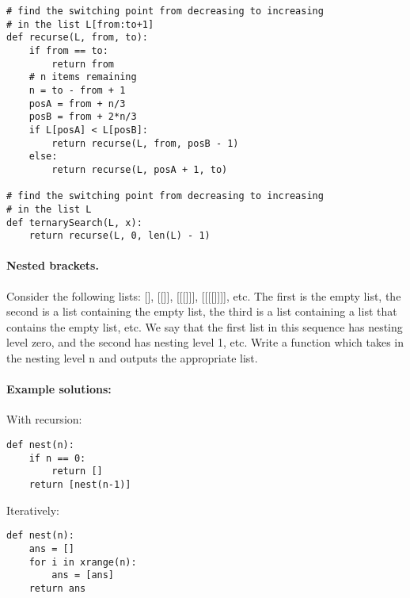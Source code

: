 \documentclass[11pt]{article}
\begin{document}
\begin{verbatim}
# find the switching point from decreasing to increasing
# in the list L[from:to+1]
def recurse(L, from, to):
    if from == to:
        return from
    # n items remaining
    n = to - from + 1
    posA = from + n/3
    posB = from + 2*n/3
    if L[posA] < L[posB]:
        return recurse(L, from, posB - 1)
    else:
        return recurse(L, posA + 1, to)

# find the switching point from decreasing to increasing
# in the list L
def ternarySearch(L, x):
    return recurse(L, 0, len(L) - 1)
\end{verbatim}

\paragraph{Nested brackets.}
Consider the following lists: [], [[]], [[[]]], [[[[]]]], etc.  The
first is the empty list, the second is a list containing the empty
list, the third is a list containing a list that contains the empty
list, etc.  We say that the first list in this sequence has nesting
level zero, and the second has nesting level 1, etc.  Write a function
which takes in the nesting level n and outputs the appropriate list.

\paragraph{Example solutions:}
With recursion:

\begin{verbatim}
def nest(n):
    if n == 0:
        return []
    return [nest(n-1)]
\end{verbatim}

Iteratively:

\begin{verbatim}
def nest(n):
    ans = []
    for i in xrange(n):
        ans = [ans]
    return ans
\end{verbatim}
\end{document}

